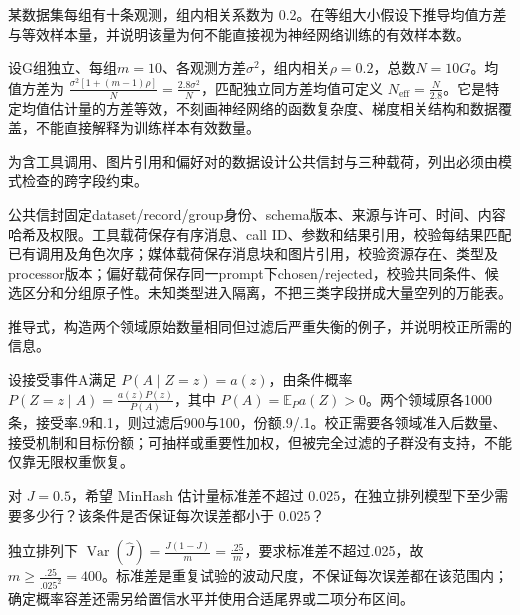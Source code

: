 
\begin{exercises}
\begin{exercise} 某数据集每组有十条观测，组内相关系数为 $0.2$。在等组大小假设下推导均值方差与等效样本量，并说明该量为何不能直接视为神经网络训练的有效样本数。

\begin{solution}
设G组独立、每组$m=10$、各观测方差$\sigma^2$，组内相关$\rho=0.2$，总数$N=10G$。均值方差为 $\frac{\sigma^2[1+(m-1)\rho]}{N}=\frac{2.8\sigma^2}{N}$，匹配独立同方差均值可定义 $N_{\mathrm{eff}}=\frac{N}{2.8}$。它是特定均值估计量的方差等效，不刻画神经网络的函数复杂度、梯度相关结构和数据覆盖，不能直接解释为训练样本有效数量。
\end{solution}
\end{exercise}

\begin{exercise} 为含工具调用、图片引用和偏好对的数据设计公共信封与三种载荷，列出必须由模式检查的跨字段约束。

\begin{solution}
公共信封固定dataset/record/group身份、schema版本、来源与许可、时间、内容哈希及权限。工具载荷保存有序消息、call ID、参数和结果引用，校验每结果匹配已有调用及角色次序；媒体载荷保存消息块和图片引用，校验资源存在、类型及processor版本；偏好载荷保存同一prompt下chosen/rejected，校验共同条件、候选区分和分组原子性。未知类型进入隔离，不把三类字段拼成大量空列的万能表。
\end{solution}
\end{exercise}

\begin{exercise} 推导式，构造两个领域原始数量相同但过滤后严重失衡的例子，并说明校正所需的信息。

\begin{solution}
设接受事件A满足 $P(A\mid Z=z)=a(z)$，由条件概率 $P(Z=z\mid A)=\frac{a(z)P(z)}{P(A)}$，其中 $P(A)=\mathbb E_Pa(Z)>0$。两个领域原各1000条，接受率.9和.1，则过滤后900与100，份额.9/.1。校正需要各领域准入后数量、接受机制和目标份额；可抽样或重要性加权，但被完全过滤的子群没有支持，不能仅靠无限权重恢复。
\end{solution}
\end{exercise}

\begin{exercise}\optional 对 $J=0.5$，希望 MinHash 估计量标准差不超过 $0.025$，在独立排列模型下至少需要多少行？该条件是否保证每次误差都小于 $0.025$？

\begin{solution}
独立排列下 $\operatorname{Var}(\widehat J)=\frac{J(1-J)}{m}=\frac{.25}{m}$，要求标准差不超过.025，故 $m\ge\frac{.25}{.025^2}=400$。标准差是重复试验的波动尺度，不保证每次误差都在该范围内；确定概率容差还需另给置信水平并使用合适尾界或二项分布区间。
\end{solution}
\end{exercise}


\end{exercises}
